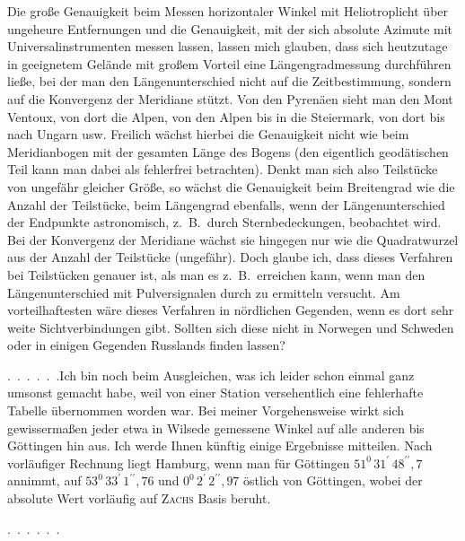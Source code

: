 \par\noindent\hspace*{\parindent}Die große Genauigkeit beim Messen horizontaler Winkel mit Heliotroplicht über ungeheure Entfernungen und die Genauigkeit, mit der sich absolute Azimute mit Universalinstrumenten messen lassen, lassen mich glauben, dass sich heutzutage in geeignetem Gelände mit großem Vorteil eine Längengradmessung durchführen ließe, bei der man den Längenunterschied nicht auf die Zeitbestimmung, sondern auf die Konvergenz der Meridiane stützt.
Von den Pyrenäen sieht man den Mont Ventoux, von dort die Alpen, von den Alpen bis in die Steiermark, von dort bis nach Ungarn usw.
Freilich wächst hierbei die Genauigkeit nicht wie beim Meridianbogen mit der gesamten Länge des Bogens (den eigentlich geodätischen Teil kann man dabei als fehlerfrei betrachten). Denkt man sich also Teilstücke von ungefähr gleicher Größe, so wächst die Genauigkeit beim Breitengrad wie die Anzahl der Teilstücke, beim Längengrad ebenfalls, wenn der Längenunterschied der Endpunkte astronomisch, z.~B.\ durch Sternbedeckungen, beobachtet wird. Bei der Konvergenz der Meridiane wächst sie hingegen nur wie die Quadratwurzel aus der Anzahl der Teilstücke (ungefähr). Doch glaube ich, dass dieses Verfahren bei  Teilstücken genauer ist, als man es z.~B.\ erreichen kann, wenn man den Längenunterschied mit Pulversignalen durch  zu ermitteln versucht.
Am vorteilhaftesten wäre dieses Verfahren in nördlichen Gegenden, wenn es dort sehr weite Sichtverbindungen gibt.
Sollten sich diese nicht in Norwegen und Schweden oder in einigen Gegenden Russlands finden lassen?

\par\noindent\hspace*{\parindent}.\ .\ .\ .\ .\ .\quad Ich bin noch beim Ausgleichen, was ich leider schon einmal ganz umsonst gemacht habe, weil von einer Station versehentlich eine fehlerhafte Tabelle übernommen worden war.
Bei meiner Vorgehensweise wirkt sich gewissermaßen jeder etwa in Wilsede gemessene Winkel auf alle anderen bis Göttingen hin aus.
Ich werde Ihnen künftig einige Ergebnisse mitteilen.
Nach vorläufiger Rechnung liegt Hamburg, wenn man für Göttingen \(51^{0}\,31^{\prime}\,48^{\prime\prime}{,}7\) annimmt, auf \(53^{0}\,33^{\prime}\,1^{\prime\prime}{,}76\) und \(0^{0}\,2^{\prime}\,2^{\prime\prime}{,}97\) östlich von Göttingen, wobei der absolute Wert vorläufig auf \textsc{Zachs} Basis beruht.
\par\noindent\hspace*{\parindent}.\ .\ .\ .\ .\ .
\endgroup
